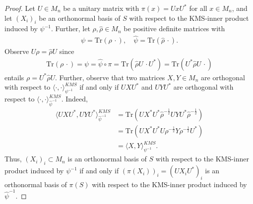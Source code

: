 \documentclass{amsart}
\begin{document}
\begin{proof}
    Let $U \in M_n$ be a unitary matrix with $\pi(x) = U x U^\ast$ for all $x \in M_n$, and let $(X_i)_i$ be an orthonormal basis of $S$ with respect to the KMS-inner product induced by $\psi^{-1}$. Further, let $\rho, \hat{\rho} \in M_n$ be positive definite matrices with
    \begin{align*}
        \psi = \mathrm{Tr}(\rho \, \cdot), \quad \hat{\psi} = \mathrm{Tr}(\hat{\rho} \, \cdot).
    \end{align*}
    Observe $U \rho = \hat{\rho} U$ since
    \begin{align*}
        \mathrm{Tr}(\rho \, \cdot) = \psi = \hat{\psi} \circ \pi = \mathrm{Tr}(\hat{\rho} U \, \cdot U^\ast) = \mathrm{Tr}(U^\ast \hat{\rho} U \, \cdot)
    \end{align*}
    entails $\rho = U^\ast \hat{\rho} U$. Further, observe that two matrices $X, Y \in M_n$ are orthogonal with respect to $\langle \cdot, \cdot \rangle^{KMS}_{\psi^{-1}}$ if and only if $UXU^\ast$ and $UYU^\ast$ are orthogonal with respect to $\langle \cdot, \cdot \rangle^{KMS}_{\hat{\psi}^{-1}}$. Indeed,
    \begin{align*}
        \langle UXU^\ast, UYU^\ast \rangle^{KMS}_{\hat{\psi}^{-1}}
            &= \mathrm{Tr}(UX^\ast U^\ast \hat{\rho}^{-\frac{1}{2}} U Y U^\ast \hat{\rho}^{-\frac{1}{2}}) \\
            &= \mathrm{Tr}(UX^\ast U^\ast U \rho^{-\frac{1}{2}} Y \rho^{-\frac{1}{2}} U^\ast) \\
            &= \langle X, Y \rangle^{KMS}_{\psi^{-1}}.
    \end{align*}
    Thus, $(X_i)_i \subset M_n$ is an orthonormal basis of $S$ with respect to the KMS-inner product induced by $\psi^{-1}$ if and only if $(\pi(X_i))_i = (U X_i U^\ast)_i$ is an orthonormal basis of $\pi(S)$ with respect to the KMS-inner product induced by $\hat{\psi}^{-1}$.
    

\end{proof}
\end{document}
